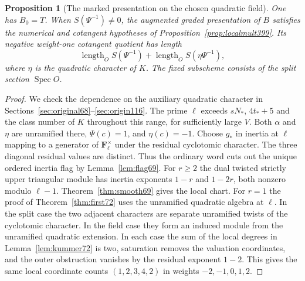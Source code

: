 \documentclass[a4paper,11pt]{article}
\newtheorem{proposition}{Proposition}[section]
\theoremstyle{definition}
\theoremstyle{remark}
\numberwithin{equation}{section}
\begin{document}
\begin{proposition}[The marked presentation on the chosen quadratic field]\leavevmode
\label{prop:originalchart425}
One has \(B_0=T\). When \(S(\Psi^{-1})\ne0\), the augmented
graded presentation of \(B\) satisfies the numerical and
cotangent hypotheses of Proposition~\ref{prop:localmult399}.
Its negative weight-one cotangent quotient has length
\[
        \operatorname{length}_O S(\Psi^{-1})+
        \operatorname{length}_O S(\eta\Psi^{-1}),
\]
where \(\eta\) is the quadratic character of \(K\).
The fixed subscheme consists of the split section \(\operatorname{Spec}O\).
\end{proposition}
\begin{proof}
We check the dependence on the auxiliary quadratic character in
Sections~\ref{sec:original68}--\ref{sec:origin116}.
The prime \(\ell\) exceeds \(sN_*\), \(4t_*+5\) and the class
number of \(K\) throughout this range, for sufficiently large
\(V\). Both \(\alpha\) and \(\eta\) are unramified there,
\(\Psi(c)=1\), and \(\eta(c)=-1\). Choose
\(g_*\) in inertia at \(\ell\) mapping to a generator of
\(\mathbf F_\ell^\times\) under the residual cyclotomic
character. The three diagonal residual values are distinct.
Thus the ordinary word cuts out the unique ordered inertia
flag by Lemma~\ref{lem:flag69}. For \(r\ge2\) the dual
twisted strictly upper triangular module has inertia exponents
\(1-r\) and \(1-2r\), both nonzero modulo \(\ell-1\).
Theorem~\ref{thm:smooth69} gives the local chart. For \(r=1\)
the proof of Theorem~\ref{thm:first72} uses the unramified
quadratic algebra at \(\ell\). In the split case the two
adjacent characters are separate unramified twists of the
cyclotomic character. In the field case they form an induced
module from the unramified quadratic extension. In each case
the sum of the local degrees in Lemma~\ref{lem:kummer72} is
two, saturation removes the valuation coordinates, and the
outer obstruction vanishes by the residual exponent \(1-2\).
This gives the same local coordinate counts
\((1,2,3,4,2)\) in weights \(-2,-1,0,1,2\).


\end{proof}
\end{document}
